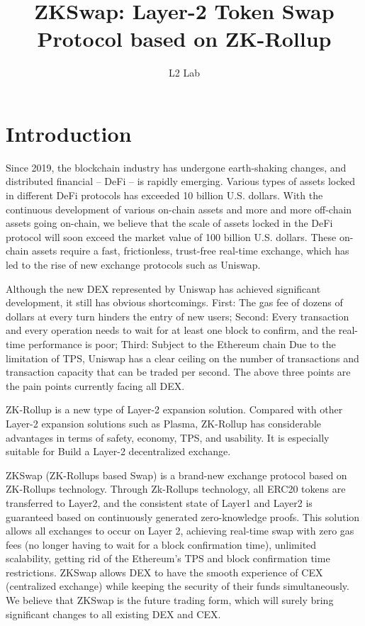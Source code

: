 \documentclass[]{template/llncs}
\begin{document}

\pagestyle{plain}

%
\title{ZKSwap: Layer-2 Token Swap Protocol based on ZK-Rollup}

\author{L2 Lab}


\maketitle

%
\section{Introduction}

Since 2019, the blockchain industry has undergone earth-shaking changes, and distributed financial -- DeFi -- is rapidly emerging. Various types of assets locked in different DeFi protocols has exceeded 10 billion U.S. dollars. With the continuous development of various on-chain assets and more and more off-chain assets going on-chain, we believe that the scale of assets locked in the DeFi protocol will soon exceed the market value of 100 billion U.S. dollars. These on-chain assets require a fast, frictionless, trust-free real-time exchange, which has led to the rise of new exchange protocols such as Uniswap\cite{uniswapofficial}.

Although the new DEX represented by Uniswap has achieved significant development, it still has obvious shortcomings. First: The gas fee of dozens of dollars at every turn hinders the entry of new users; Second: Every transaction and every operation needs to wait for at least one block to confirm, and the real-time performance is poor; Third: Subject to the Ethereum chain Due to the limitation of TPS, Uniswap has a clear ceiling on the number of transactions and transaction capacity that can be traded per second. The above three points are the pain points currently facing all DEX.

ZK-Rollup\cite{zkrollups} is a new type of Layer-2 expansion solution. Compared with other Layer-2 expansion solutions such as Plasma, ZK-Rollup has considerable advantages in terms of safety, economy, TPS, and usability. It is especially suitable for Build a Layer-2 decentralized exchange.

ZKSwap (ZK-Rollups based Swap) is a brand-new exchange protocol based on ZK-Rollups technology. Through Zk-Rollups technology, all ERC20 tokens are transferred to Layer2, and the consistent state of Layer1 and Layer2 is guaranteed based on continuously generated zero-knowledge proofs. This solution allows all exchanges to occur on Layer 2, achieving real-time swap with zero gas fees (no longer having to wait for a block confirmation time), unlimited scalability, getting rid of the Ethereum's TPS and block confirmation time restrictions. ZKSwap allows DEX to have the smooth experience of CEX (centralized exchange) while keeping the security of their funds simultaneously. We believe that ZKSwap is the future trading form, which will surely bring significant changes to all existing DEX and CEX.
\end{document}
